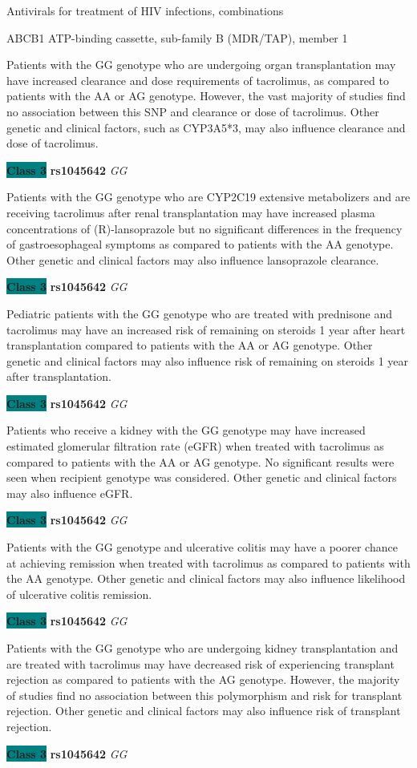 \documentclass{resume} %
\begin{document}
\begin{rSection}{ Antivirals for treatment of HIV infections, combinations }
\begin{rSubsection}{ ABCB1 }{ ATP-binding cassette, sub-family B (MDR/TAP), member 1 }{}{}
\item[] Patients with the GG genotype who are undergoing organ transplantation may have increased clearance and dose requirements of tacrolimus, as compared to patients with the AA or AG genotype. However, the vast majority of studies find no association between this SNP and clearance or dose of tacrolimus. Other genetic and clinical factors, such as CYP3A5*3, may also influence clearance and dose of tacrolimus. \item \textbf{\colorbox{teal} {Class 3}} \textbf{ rs1045642 } \textit{ GG }
\item[] Patients with the GG genotype who are CYP2C19 extensive metabolizers and are receiving tacrolimus after renal transplantation may have increased plasma concentrations of (R)-lansoprazole but no significant differences in the frequency of gastroesophageal symptoms as compared to patients with the AA genotype. Other genetic and clinical factors may also influence lansoprazole clearance.\item \textbf{\colorbox{teal} {Class 3}} \textbf{ rs1045642 } \textit{ GG }
\item[] Pediatric patients with the GG genotype who are treated with prednisone and tacrolimus may have an increased risk of remaining on steroids 1 year after heart transplantation compared to patients with the AA or AG genotype. Other genetic and clinical factors may also influence risk of remaining on steroids 1 year after transplantation.\item \textbf{\colorbox{teal} {Class 3}} \textbf{ rs1045642 } \textit{ GG }
\item[] Patients who receive a kidney with the GG genotype may have increased estimated glomerular filtration rate (eGFR) when treated with tacrolimus as compared to patients with the AA or AG genotype. No significant results were seen when recipient genotype was considered. Other genetic and clinical factors may also influence eGFR. \item \textbf{\colorbox{teal} {Class 3}} \textbf{ rs1045642 } \textit{ GG }
\item[] Patients with the GG genotype and ulcerative colitis may have a poorer chance at achieving remission when treated with tacrolimus as compared to patients with the AA genotype. Other genetic and clinical factors may also influence likelihood of ulcerative colitis remission.\item \textbf{\colorbox{teal} {Class 3}} \textbf{ rs1045642 } \textit{ GG }
\item[] Patients with the GG genotype who are undergoing kidney transplantation and are treated with tacrolimus may have decreased risk of experiencing transplant rejection as compared to patients with the AG genotype. However, the majority of studies find no association between this polymorphism and risk for transplant rejection. Other genetic and clinical factors may also influence risk of transplant rejection.\item \textbf{\colorbox{teal} {Class 3}} \textbf{ rs1045642 } \textit{ GG }

\end{rSubsection}
\end{rSection}
\end{document}
